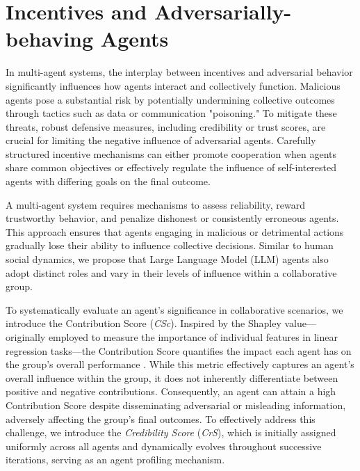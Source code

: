\section{Incentives and Adversarially-behaving Agents}\label{app:behavior}

In multi-agent systems, the interplay between incentives and adversarial behavior significantly influences how agents interact and collectively function. Malicious agents pose a substantial risk by potentially undermining collective outcomes through tactics such as data or communication "poisoning." To mitigate these threats, robust defensive measures, including credibility or trust scores, are crucial for limiting the negative influence of adversarial agents. Carefully structured incentive mechanisms can either promote cooperation when agents share common objectives or effectively regulate the influence of self-interested agents with differing goals on the final outcome.

A multi-agent system requires mechanisms to assess reliability, reward trustworthy behavior, and penalize dishonest or consistently erroneous agents. This approach ensures that agents engaging in malicious or detrimental actions gradually lose their ability to influence collective decisions. Similar to human social dynamics, we propose that Large Language Model (LLM) agents also adopt distinct roles and vary in their levels of influence within a collaborative group.

To systematically evaluate an agent's significance in collaborative scenarios, we introduce the Contribution Score (\textit{CSc}). Inspired by the Shapley value—originally employed to measure the importance of individual features in linear regression tasks—the Contribution Score quantifies the impact each agent has on the group's overall performance \cite{shap}. While this metric effectively captures an agent's overall influence within the group, it does not inherently differentiate between positive and negative contributions. Consequently, an agent can attain a high Contribution Score despite disseminating adversarial or misleading information, adversely affecting the group's final outcomes. 
To effectively address this challenge, we introduce the \textit{Credibility Score} (\textit{CrS}), which is initially assigned uniformly across all agents and dynamically evolves throughout successive iterations, serving as an agent profiling mechanism. 

